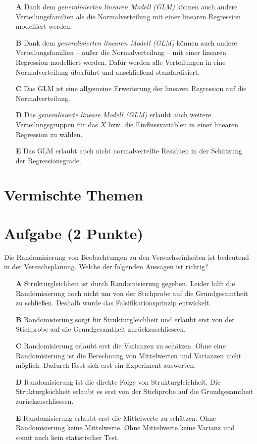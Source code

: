 \documentclass[a4paper, 9pt]{scrartcl}\usepackage[]{graphicx}\usepackage[]{xcolor}
\begin{document}
\begin{enumerate}
\item [\textbf{A} \msquare] Dank dem \textit{generalisierten linearen Modell (GLM)} können auch andere Verteilungsfamilien als die Normalverteilung mit einer linearen Regression modelliert werden.
\item [\textbf{B} \msquare] Dank dem \textit{generalisierten linearen Modell (GLM)} können auch andere Verteilungsfamilien -- außer die Normalverteilung -- mit einer linearen Regression modelliert werden. Dafür werden alle Verteilungen in eine Normalverteilung überführt und anschließend standardisiert.
\item [\textbf{C} \msquare] Das GLM ist eine allgemeine Erweiterung der linearen Regression auf die Normalverteilung.
\item [\textbf{D} \msquare] Das \textit{generalisierte lineare Modell (GLM)} erlaubt auch weitere Verteilungsgruppen für das $X$ bzw. die Einflussvariablen in einer linearen Regression zu wählen.
\item [\textbf{E} \msquare] Das GLM erlaubt auch nicht normalverteilte Residuen in der Schätzung der Regressionsgrade.
\end{enumerate}
\section*{Vermischte Themen}  

\section{Aufgabe \hfill (2 Punkte)}

Die Randomisierung von Beobachtungen zu den Versuchseinheiten
ist bedeutend in der Versuchsplanung. Welche der folgenden Aussagen ist richtig?



\begin{enumerate}
\item [\textbf{A} \msquare] Strukturgleichheit ist durch Randomisierung gegeben. Leider hilft die Randomisierung noch nicht um von der Stichprobe auf die Grundgesamtheit zu schließen. Deshalb wurde das Falsifikationsprinzip entwickelt.
\item [\textbf{B} \msquare] Randomisierung sorgt für Strukturgleichheit und erlaubt erst von der Stichprobe auf die Grundgesamtheit zurückzuschliessen.
\item [\textbf{C} \msquare] Randomisierung erlaubt erst die Varianzen zu schätzen. Ohne eine Randomisierung ist die Berechnung von Mittelwerten und Varianzen nicht möglich. Dadurch lässt sich erst ein Experiment auswerten.
\item [\textbf{D} \msquare] Randomisierung ist die direkte Folge von Strukturgleichheit. Die Strukturgleichheit erlaubt es erst von der Stichprobe auf die Grundgesamtheit zurückzuschliessen.
\item [\textbf{E} \msquare] Randomisierung erlaubt erst die Mittelwerte zu schätzen. Ohne Randomisierung keine Mittelwerte. Ohne Mittelwerte keine Varianz und somit auch kein statistischer Test.
\end{enumerate}
\end{document}
